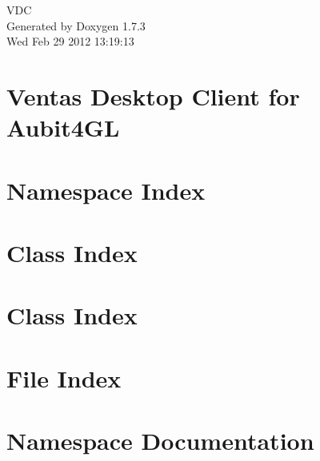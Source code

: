 \documentclass[a4paper]{book}
\begin{document}
\hypersetup{pageanchor=false}
\begin{titlepage}
\vspace*{7cm}
\begin{center}
{\Large VDC }\\
\vspace*{1cm}
{\large Generated by Doxygen 1.7.3}\\
\vspace*{0.5cm}
{\small Wed Feb 29 2012 13:19:13}\\
\end{center}
\end{titlepage}
\clearemptydoublepage
{}
\tableofcontents
\clearemptydoublepage
{}
\hypersetup{pageanchor=true}
\chapter{Ventas Desktop Client for Aubit4GL}
\label{index}\hypertarget{index}{}
\chapter{Namespace Index}

\chapter{Class Index}

\chapter{Class Index}

\chapter{File Index}

\chapter{Namespace Documentation}





\end{document}
